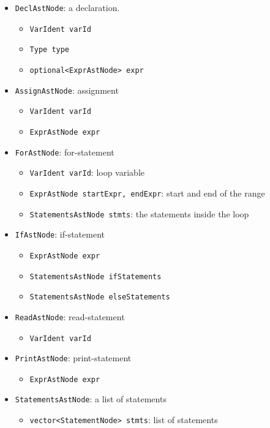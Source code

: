 \documentclass[a4paper]{article}
\newcommand*{\code}[1]{\texttt{#1}}
\begin{document}
\begin{itemize}
  \item \code{DeclAstNode}: a declaration.
  \begin{itemize}
    \item[] \code{VarIdent varId}
    \item[] \code{Type type} 
    \item[] \code{optional<ExprAstNode> expr}
  \end{itemize}
  \item \code{AssignAstNode}: assignment
  \begin{itemize}
    \item[] \code{VarIdent varId}
    \item[] \code{ExprAstNode expr}
  \end{itemize}
  \item \code{ForAstNode}: for-statement
  \begin{itemize}
    \item[] \code{VarIdent varId}: loop variable
    \item[] \code{ExprAstNode startExpr, endExpr}: start and end of the range
    \item[] \code{StatementsAstNode stmts}: the statements inside the loop
  \end{itemize}
  \item \code{IfAstNode}: if-statement
  \begin{itemize}
    \item[] \code{ExprAstNode expr}
    \item[] \code{StatementsAstNode ifStatements}
    \item[] \code{StatementsAstNode elseStatements}
  \end{itemize}
  \item \code{ReadAstNode}: read-statement
  \begin{itemize}
    \item[] \code{VarIdent varId}
  \end{itemize}
  \item \code{PrintAstNode}: print-statement
  \begin{itemize}
    \item[] \code{ExprAstNode expr}
  \end{itemize}
  \item \code{StatementsAstNode}: a list of statements
  \begin{itemize}
    \item[] \code{vector<StatementNode> stmts}: list of statements
  \end{itemize}
\end{itemize}
\end{document}
